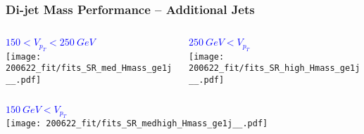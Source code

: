 \documentclass{beamer}
\newcommand{\beginbackup}{
  \newcounter{framenumbervorappendix}
  \setcounter{framenumbervorappendix}{\value{framenumber}}
}
\newcommand{\backupend}{
  \addtocounter{framenumbervorappendix}{-\value{framenumber}}
  \addtocounter{framenumber}{\value{framenumbervorappendix}}
}
\begin{document}
\begin{frame}
  \frametitle{Di-jet Mass Performance -- Additional Jets}

  \begin{columns}
    \begin{column}{0.5\linewidth}
      \centering
      \textcolor{blue}{$150 < V_{p_T} < \SI{250}{GeV}$} \\
      \texttt{[image: 200622\_fit/fits\_SR\_med\_Hmass\_ge1j\_\_.pdf]}
    \end{column}
    \begin{column}{0.5\linewidth}
      \centering
      \textcolor{blue}{$\SI{250}{GeV} < V_{p_T}$} \\
      \texttt{[image: 200622\_fit/fits\_SR\_high\_Hmass\_ge1j\_\_.pdf]}
    \end{column}
  \end{columns}

  \centering
  \textcolor{blue}{$\SI{150}{GeV} < V_{p_T}$} \\
  \texttt{[image: 200622\_fit/fits\_SR\_medhigh\_Hmass\_ge1j\_\_.pdf]}

\end{frame}

\begin{comment}
\beginbackup

\begin{frame}
  \centering
    {\Huge \bf\sffamily Backup Slides}
\end{frame}



\backupend
\end{comment}
\end{document}
